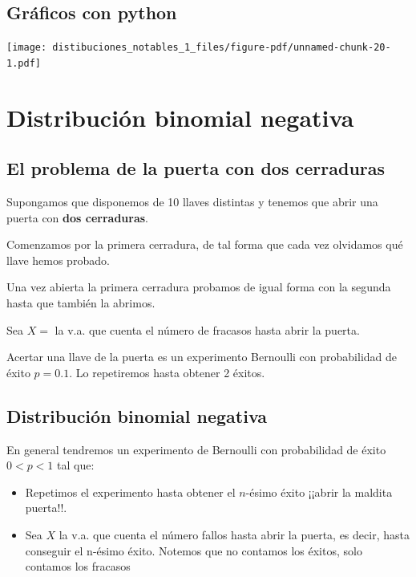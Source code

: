 \documentclass[
  letterpaper,
  DIV=11,
  numbers=noendperiod]{scrreprt}
\providecommand{\tightlist}{%
  \setlength{\itemsep}{0pt}\setlength{\parskip}{0pt}}\usepackage{longtable,booktabs,array}
\begin{document}
\section{Gráficos con python}\label{gruxe1ficos-con-python-1}

\begin{center}
\texttt{[image: distibuciones\_notables\_1\_files/figure-pdf/unnamed-chunk-20-1.pdf]}
\end{center}

\chapter{Distribución binomial
negativa}\label{distribuciuxf3n-binomial-negativa}

\section{El problema de la puerta con dos
cerraduras}\label{el-problema-de-la-puerta-con-dos-cerraduras}

Supongamos que disponemos de 10 llaves distintas y tenemos que abrir una
puerta con \textbf{dos cerraduras}.

Comenzamos por la primera cerradura, de tal forma que cada vez olvidamos
qué llave hemos probado.

Una vez abierta la primera cerradura probamos de igual forma con la
segunda hasta que también la abrimos.

Sea \(X=\) la v.a. que cuenta el número de fracasos hasta abrir la
puerta.

Acertar una llave de la puerta es un experimento Bernoulli con
probabilidad de éxito \(p=0.1\). Lo repetiremos hasta obtener 2 éxitos.

\section{Distribución binomial
negativa}\label{distribuciuxf3n-binomial-negativa-1}

En general tendremos un experimento de Bernoulli con probabilidad de
éxito \(0<p<1\) tal que:

\begin{itemize}
\tightlist
\item
  Repetimos el experimento hasta obtener el \(n\)-ésimo éxito ¡¡abrir la
  maldita puerta!!.
\item
  Sea \(X\) la v.a. que cuenta el número fallos hasta abrir la puerta,
  es decir, hasta conseguir el n-ésimo éxito. Notemos que no contamos
  los éxitos, solo contamos los fracasos
\end{itemize}
\end{document}
